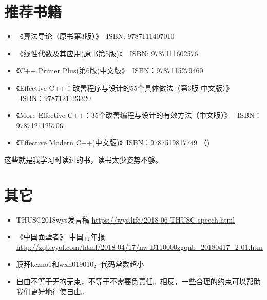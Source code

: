 \section{推荐书籍}
\begin{itemize}
    \item 《算法导论（原书第3版）》~ISBN: 9787111407010
    \item 《线性代数及其应用(原书第5版)》~ISBN: 9787111602576
    \item 《C++ Primer Plus(第6版)中文版》~ISBN：9787115279460
    \item 《Effective C++：改善程序与设计的55个具体做法（第3版 中文版）》
    ~ISBN：9787121123320
    \item 《More Effective C++：35个改善编程与设计的有效方法（中文版）》
    ~ISBN：9787121125706
    \item 《Effective Modern C++(中文版)》~ISBN：9787519817749
    （)
\end{itemize}

这些就是我学习时读过的书，读书太少姿势不够。
\section{其它}
\begin{itemize}
    \item THUSC2018wys发言稿 \url{https://wys.life/2018-06-THUSC-speech.html}
    \item 《中国面壁者》 中国青年报\\
    {\footnotesize \url{http://zqb.cyol.com/html/2018-04/17/nw.D110000zgqnb_20180417_2-01.htm}}
    \item 膜拜kczno1和wxh019010，代码常数超小
    \item 自由不等于无拘无束，不等于不需要负责任。相反，一些合理的约束可以帮助我们更好地行使自由。
\end{itemize}
